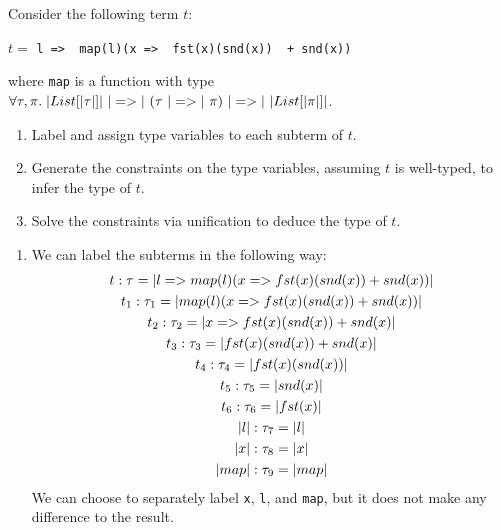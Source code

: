 
\begin{exercise}{}
  Consider the following term \(t\):
  \begin{center}
    \(t = \) \lstinline{l =>  map(l)(x =>  fst(x)(snd(x))  + snd(x))}
  \end{center}

  where \lstinline|map| is a function with type \(\forall \tau, \pi.\;
  \alist{\tau} ~\ato~ (\tau ~\ato~ \pi) ~\ato~ \alist{\pi}\).

  \begin{enumerate}
    \item Label and assign type variables to each subterm of \(t\).
    \item Generate the constraints on the type variables, assuming \(t\) is
    well-typed, to infer the type of \(t\).
    \item Solve the constraints via unification to deduce the type of \(t\).
  \end{enumerate}
  
  \begin{solution}
    \begin{enumerate}
      \item We can label the subterms in the following way:
      \begin{gather}
        t: \tau = \lstinline|l =>  map(l)(x =>  fst(x)(snd(x))  + snd(x))| \\
        t_1: \tau_1 = \lstinline|map(l)(x =>  fst(x)(snd(x))  + snd(x))| \\
        t_2: \tau_2 = \lstinline|x =>  fst(x)(snd(x))  + snd(x)| \\
        t_3: \tau_3 = \lstinline|fst(x)(snd(x)) + snd(x)| \\
        t_4: \tau_4 = \lstinline|fst(x)(snd(x))| \\
        t_5: \tau_5 = \lstinline|snd(x)| \\
        t_6: \tau_6 = \lstinline|fst(x)| \\
        \lstinline|l|: \tau_7 = \lstinline|l| \\
        \lstinline|x|: \tau_8 = \lstinline|x| \\
        \lstinline|map|: \tau_9 = \lstinline|map|
      \end{gather}
      We can choose to separately label \lstinline|x|, \lstinline|l|, and
      \lstinline|map|, but it does not make any difference to the result.


\end{enumerate}
\end{solution}
\end{exercise}
